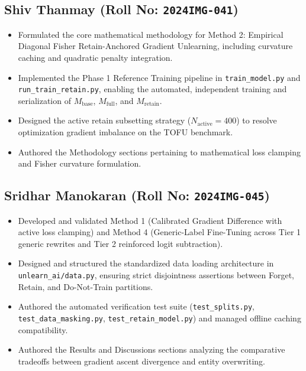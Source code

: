 \documentclass[11pt,a4paper]{article}
\begin{document}
\subsection*{Shiv Thanmay (Roll No: \texttt{2024IMG-041})}
\begin{itemize}
    \item Formulated the core mathematical methodology for Method 2: Empirical Diagonal Fisher Retain-Anchored Gradient Unlearning, including curvature caching and quadratic penalty integration.
    \item Implemented the Phase 1 Reference Training pipeline in \texttt{train\_model.py} and \texttt{run\_train\_retain.py}, enabling the automated, independent training and serialization of $M_{\text{base}}$, $M_{\text{full}}$, and $M_{\text{retain}}$.
    \item Designed the active retain subsetting strategy ($N_{\text{active}}=400$) to resolve optimization gradient imbalance on the TOFU benchmark.
    \item Authored the Methodology sections pertaining to mathematical loss clamping and Fisher curvature formulation.
\end{itemize}

\subsection*{Sridhar Manokaran (Roll No: \texttt{2024IMG-045})}
\begin{itemize}
    \item Developed and validated Method 1 (Calibrated Gradient Difference with active loss clamping) and Method 4 (Generic-Label Fine-Tuning across Tier 1 generic rewrites and Tier 2 reinforced logit subtraction).
    \item Designed and structured the standardized data loading architecture in \texttt{unlearn\_ai/data.py}, ensuring strict disjointness assertions between Forget, Retain, and Do-Not-Train partitions.
    \item Authored the automated verification test suite (\texttt{test\_splits.py}, \texttt{test\_data\_masking.py}, \texttt{test\_retain\_model.py}) and managed offline caching compatibility.
    \item Authored the Results and Discussions sections analyzing the comparative tradeoffs between gradient ascent divergence and entity overwriting.
\end{itemize}
\end{document}
